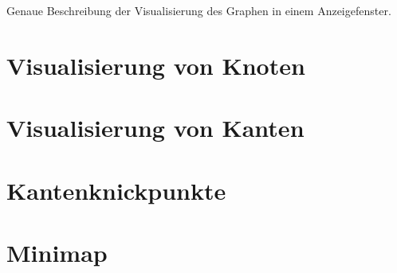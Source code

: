 %
%

Genaue Beschreibung der Visualisierung des Graphen in einem Anzeigefenster.
\section{Visualisierung von Knoten}
\section{Visualisierung von Kanten}
\section{Kantenknickpunkte}
\section{Minimap}
